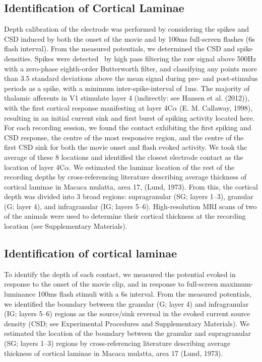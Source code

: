 \subsection{Identification of Cortical Laminae}
Depth calibration of the electrode was performed by considering the spikes and CSD induced by both the onset of the movie and by 100ms full-screen flashes (6s flash interval). From the measured potentials, we determined the CSD and spike densities. Spikes were detected \ by high pass filtering the raw signal above 500Hz with a zero-phase eighth-order Butterworth filter, and classifying any points more than 3.5 standard deviations above the mean signal during pre- and post-stimulus periods as a spike, with a minimum inter-spike-interval of 1ms. The majority of thalamic afferents in V1 stimulate layer 4 (indirectly: see Hansen et al. (2012)), with the first cortical response manifesting at layer 4C$\alpha$ (E. M. Callaway, 1998), resulting in an initial current sink and first burst of spiking activity located here. For each recording session, we found the contact exhibiting the first spiking and CSD response, the centre of the most responsive region, and the centre of the first CSD sink for both the movie onset and flash evoked activity. We took the average of these 8 locations and identified the closest electrode contact as the location of layer 4C$\alpha$. We estimated the laminar location of the rest of the recording depths by cross-referencing literature describing average thickness of cortical laminae in Macaca mulatta, area 17, (Lund, 1973). From this, the cortical depth was divided into 3 broad regions: supragranular (SG; layers 1--3), granular (G; layer 4), and infragranular (IG; layers 5--6). High-resolution MRI scans of two of the animals were used to determine their cortical thickness at the recording location (see Supplementary Materials).

\subsection{Identification of cortical laminae}
To identify the depth of each contact, we measured the potential evoked in response to the onset of the movie clip, and in response to full-screen maximum-luminance 100ms flash stimuli with a 6s interval. From the measured potentials, we identified the boundary between the granular (G; layer 4) and infragranular (IG; layers 5--6) regions as the source/sink reversal in the evoked current source density (CSD; see Experimental Procedures and Supplementary Materials). We estimated the location of the boundary between the granular and supragranular (SG; layers 1--3) regions by cross-referencing literature describing average thickness of cortical laminae in Macaca mulatta, area 17 (Lund, 1973).

